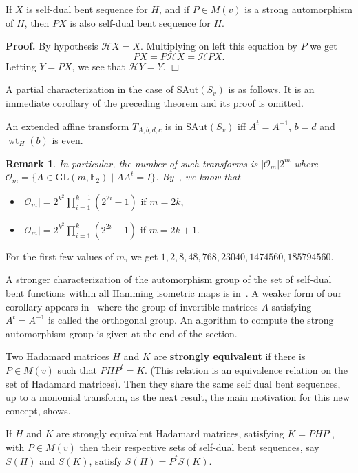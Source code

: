 \documentclass[12pt]{article}
\newenvironment{pf}{\noindent\textbf{Proof.}\quad}{\hfill{$\Box$}}
\newtheorem{rem}{Remark}
\newcommand{\F}{\mathbb{F}}
\def\GL{\mathrm{GL}}
\def\SAut{\mathrm{SAut}}
\DeclareMathOperator{\wt}{wt}
\begin{document}
{\prop If $X$ is self-dual bent sequence
for $H$, and if $P\in M(v)$ is a strong automorphism of $H$, then $PX$ is also self-dual bent sequence for $H$.}

\begin{pf}
 By hypothesis $\mathcal{H}X=X$. Multiplying on left this equation by $P$ we get
 $$PX=P \mathcal{H}X=\mathcal{H}PX. $$ Letting $Y=PX$, we see that $\mathcal{H}Y=Y$.
\end{pf}

A partial characterization in the case of $\SAut(S_v)$ is as follows. It is an immediate corollary of the preceding theorem and its proof is omitted.

{\coro An extended affine transform $T_{A,b,d,c}$ is in $\SAut(S_v)$ iff $A^t = A^{-1}$, $b=d$ and $\wt_H(b)$ is even.}
\begin{rem}
{\em In particular, the number of such transforms is $|\mathcal{O}_m|2^m$ where $\mathcal{O}_m=\{ A \in \GL(m,\F_2) \mid AA^t=I\}$. By~\cite[Theorem 4]{Janusz:2007}, we know that}
\end{rem}
\begin{itemize}
 \item $|\mathcal{O}_m|=2^{k^2}\prod\limits_{i=1}^{k-1}(2^{2i}-1)$ if $m=2k$,
 \item $|\mathcal{O}_m|=2^{k^2}\prod\limits_{i=1}^{k}(2^{2i}-1)$ if $m=2k+1$.
\end{itemize}
For the first few values of $m$, we get $1,
2,
8,
48,
768,
23040,
1474560,
185794560$.


A stronger characterization of the automorphism group of the set of self-dual bent functions within all Hamming isometric maps is in~\cite{Kutsenko:2020}.
A weaker form of our corollary appears in~\cite[Theorem 1]{FSSW:2013} where the group of invertible matrices $A$ satisfying $A^{t}=A^{-1}$ is called the orthogonal group.
An algorithm to compute the strong automorphism group is given at the end of the section.

Two Hadamard matrices $H$ and $K$ are {\bf strongly equivalent} if there is $P\in M(v)$  such that $PHP^t=K$. (This relation is an equivalence relation on the set of Hadamard matrices). Then they share the same self dual bent sequences, up to a monomial transform, as the next result, the main motivation for this new concept, shows.

{\prop If $H$ and $K$ are {strongly equivalent} Hadamard matrices, satisfying $K=PHP^t$, with $P\in M(v)$ then their respective sets of self-dual bent sequences, say $S(H)$
and $S(K)$, satisfy $S(H)=P^{t}S(K)$. }
\end{document}
